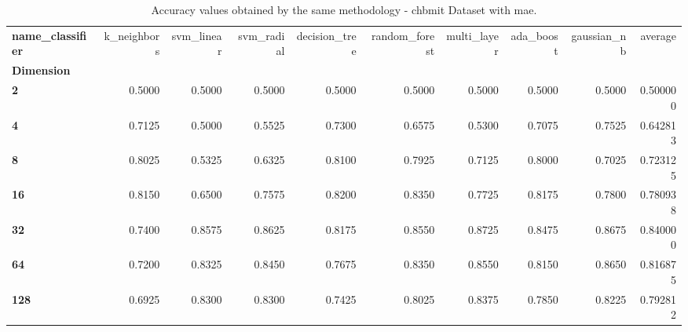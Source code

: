 \begin{table}
\centering
\caption{Accuracy values obtained by the same methodology - chbmit Dataset with mae.}
\label{accuracy_chbmit_mae-reproduction}
\begin{tabular}{lrrrrrrrrr}
\toprule
\textbf{name\_classifier} &  k\_neighbors &  svm\_linear &  svm\_radial &  decision\_tree &  random\_forest &  multi\_layer &  ada\_boost &  gaussian\_nb &   average \\
\textbf{Dimension} &              &             &             &                &                &              &            &              &           \\
\midrule
\textbf{2        } &       0.5000 &      0.5000 &      0.5000 &         0.5000 &         0.5000 &       0.5000 &     0.5000 &       0.5000 &  0.500000 \\
\textbf{4        } &       0.7125 &      0.5000 &      0.5525 &         0.7300 &         0.6575 &       0.5300 &     0.7075 &       0.7525 &  0.642813 \\
\textbf{8        } &       0.8025 &      0.5325 &      0.6325 &         0.8100 &         0.7925 &       0.7125 &     0.8000 &       0.7025 &  0.723125 \\
\textbf{16       } &       0.8150 &      0.6500 &      0.7575 &         0.8200 &         0.8350 &       0.7725 &     0.8175 &       0.7800 &  0.780938 \\
\textbf{32       } &       0.7400 &      0.8575 &      0.8625 &         0.8175 &         0.8550 &       0.8725 &     0.8475 &       0.8675 &  0.840000 \\
\textbf{64       } &       0.7200 &      0.8325 &      0.8450 &         0.7675 &         0.8350 &       0.8550 &     0.8150 &       0.8650 &  0.816875 \\
\textbf{128      } &       0.6925 &      0.8300 &      0.8300 &         0.7425 &         0.8025 &       0.8375 &     0.7850 &       0.8225 &  0.792812 \\
\bottomrule
\end{tabular}
\end{table}
